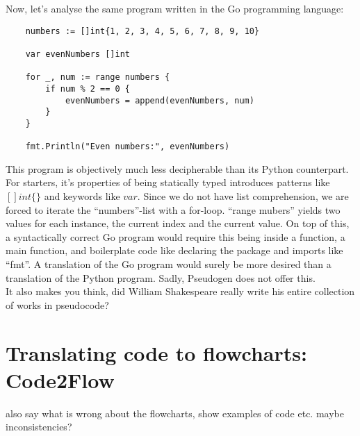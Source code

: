 Now, let's analyse the same program written in the Go programming language:

\begin{verbatim}
    numbers := []int{1, 2, 3, 4, 5, 6, 7, 8, 9, 10}

    var evenNumbers []int

    for _, num := range numbers {
        if num % 2 == 0 {
            evenNumbers = append(evenNumbers, num)
        }
    }

    fmt.Println("Even numbers:", evenNumbers)
\end{verbatim}

This program is objectively much less decipherable than its Python counterpart. For starters, it's properties of being statically typed introduces patterns like $[]int\{\}$ and keywords like $var$. Since we do not have list comprehension, we are forced to iterate the ``numbers''-list with a for-loop. ``range mubers'' yields two values for each instance, the current index and the current value. On top of this, a syntactically correct Go program would require this being inside a function, a main function, and boilerplate code like declaring the package and imports like ``fmt''. A translation of the Go program would surely be more desired than a translation of the Python program. Sadly, Pseudogen does not offer this. \hfill \\

It also makes you think, did William Shakespeare really write his entire collection of works in pseudocode? \hfill \\

\section{Translating code to flowcharts: Code2Flow}

also say what is wrong about the flowcharts, show examples of code etc. maybe inconsistencies?